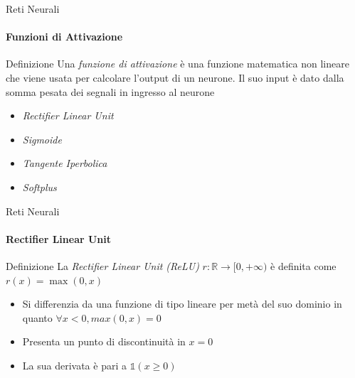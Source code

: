 \documentclass[
 ]{beamer}
\begin{document}
\begin{frame}{Reti Neurali}
    \framesubtitle{Funzioni di Attivazione}
    \begin{block}{Definizione} 
        \large Una \emph{funzione di attivazione} è una funzione matematica non lineare che viene usata per calcolare l'output di un neurone. Il suo input è dato dalla somma pesata dei segnali in ingresso al neurone
    \end{block}\pause
    
    \bigskip
    
    \begin{itemize} [<+->]
        \setlength\itemsep{1.5em}
        \item \emph{\large Rectifier Linear Unit}
        \item \emph{\large Sigmoide}
        \item \emph{\large Tangente Iperbolica}
        \item \emph{\large Softplus}
    \end{itemize}
\end{frame}

\begin{frame}{Reti Neurali}
    \framesubtitle{Rectifier Linear Unit}
    \begin{block}{Definizione} 
        \large La \emph{Rectifier Linear Unit (ReLU)} $r: \mathbb{R} \rightarrow [0, +\infty)$ è definita come $r(x) = \max(0,x)$  
    \end{block}\pause
    
    \bigskip
    
    \begin{itemize} [<+->]
        \setlength\itemsep{2em}
        \item \large Si differenzia da una funzione di tipo lineare per metà del suo dominio in quanto $\forall x < 0, max(0,x) = 0$
        \item \large Presenta un punto di discontinuità in $x = 0$
        \item \large La sua derivata è pari a $\mathds{1}(x \geq 0)$
    \end{itemize}
\end{frame}
\end{document}
